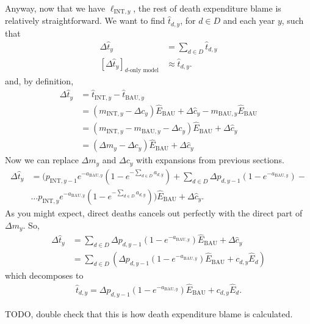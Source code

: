\documentclass[]{article}
\begin{document}
Anyway, now that we have $\ell_{\text{INT}, y}$, the rest of death expenditure blame is relatively straightforward. We want to find $\widehat{t}_{d, y}$, for $d \in D$ and each year $y$, such that
\begin{align*}
	\Delta \widehat{t}_y &= \sum_{d \in D} \widehat{t}_{d, y} \\
	[\Delta \widehat{t}_y]_\text{$d$-only model} &\approx \widehat{t}_{d, y}.
\end{align*}
and, by definition,
\begin{align*}
	\Delta \widehat{t}_y &= \widehat{t}_{\text{INT}, y}  - \widehat{t}_{\text{BAU}, y} \\
	&= \left(m_{\text{INT}, y} - \Delta c_y\right)\widehat{E}_\text{BAU} + \Delta \widehat{c}_y - m_{\text{BAU}, y}\widehat{E}_\text{BAU} \\
	&= \left(m_{\text{INT}, y}  - m_{\text{BAU}, y} - \Delta c_y\right)\widehat{E}_\text{BAU} + \Delta \widehat{c}_y \\
	&= \left(\Delta m_y - \Delta c_y\right)\widehat{E}_\text{BAU} + \Delta \widehat{c}_y
\end{align*}
Now we can replace $\Delta m_y$ and $\Delta c_y$ with expansions from previous sections.
\begin{align*}
	\Delta \widehat{t}_y &= ( p_{\text{INT}, y-1} e^{-a_{\text{BAU}, y}} \left(1 - e^{-\sum_{d \in D} a_{d, y}}\right)
	+ \sum_{d \in D} \Delta p_{d, y - 1} \left(1 - e^{-a_{\text{BAU}, y}}\right) - \\
	&\ldots  p_{\text{INT}, y} e^{-a_{\text{BAU}, y}} \left(1 - e^{-\sum_{d \in D} a_{d, y}}\right) )\widehat{E}_\text{BAU} + \Delta \widehat{c}_y.
\end{align*}
As you might expect, direct deaths cancels out perfectly with the direct part of $\Delta m_y$. So,
\begin{align*}
	\Delta \widehat{t}_y &= \sum_{d \in D} \Delta p_{d, y - 1} \left(1 - e^{-a_{\text{BAU}, y}}\right)\widehat{E}_\text{BAU} + \Delta \widehat{c}_y \\
	&= \sum_{d \in D} \left(\Delta p_{d, y - 1} \left(1 - e^{-a_{\text{BAU}, y}}\right)\widehat{E}_\text{BAU}  + c_{d, y} \widehat{E}_d \right)
\end{align*}
which decomposes to
\begin{align*}
	\widehat{t}_{d, y} = \Delta p_{d, y - 1} \left(1 - e^{-a_{\text{BAU}, y}}\right)\widehat{E}_\text{BAU}  + c_{d, y} \widehat{E}_d.
\end{align*}

TODO, double check that this is how death expenditure blame is calculated.
\end{document}
